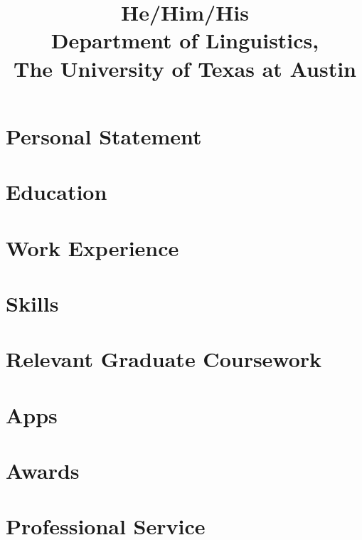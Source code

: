 \documentclass{practical-cv}
\title{He/Him/His\\Department of Linguistics,\\The University of Texas at Austin}
\begin{document}
\makecvtitle

\section{Personal Statement}


\section{Education}


\section{Work Experience}


\printbibliography[title=Select Publications, keyword=resume]

\section{Skills}


\section{Relevant Graduate Coursework}


\section{Apps}


\section{Awards}


\section{Professional Service}

\end{document}
